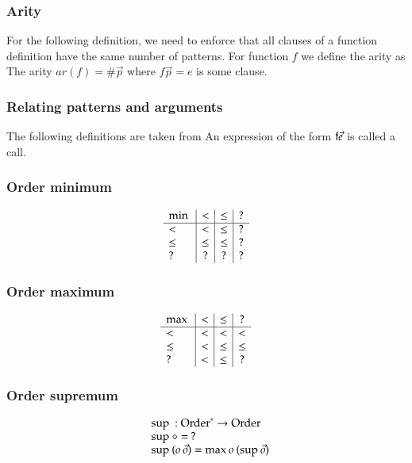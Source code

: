 \subsubsection{Arity}
For the following definition, we need to enforce that all clauses of a function definition have the same number of patterns.
For function $f$ we define the arity as The arity $ar(f) = \# \vec{p} $ where $f \vec{p} = e $ is some clause.   


\subsubsection{Relating patterns and arguments}

The following definitions are taken from \cite{abelAltenkirch:predStRec}
An expression of the form $\mathsf{f} \vec{e}$ is called a call.

\newcommand{\mino}{\mathrm{min}\:}
\newcommand{\maxo}{\mathrm{max}\:}
\newcommand{\supo}{\mathrm{sup}\:}
\newcommand{\info}{\mathrm{inf}\:}

\subsubsection{Order minimum}
\[
\begin{array}{l | c |c | c}
 \mino &  <      &  \leq    & ? \\
\hline
  <    & <       &  \leq    &   ? \\
 \leq  & \leq    &  \leq    &   ?  \\
 ?     & ?       &  ?       &   ?
\end{array}
\]

\subsubsection{Order maximum}
\[
\begin{array}{l | c |c | c}
 \maxo & <      &  \leq    &   ? \\
\hline
  <    & <       & <       &   <    \\
 \leq  & <       & \leq    &   \leq  \\
 ?     & <       & \leq    &   ?
\end{array}
\]

\subsubsection{Order supremum}
\[
\begin{array}[t]{ll}
\multicolumn{2}{l}{\supo : \ves{\order} \ra \order}\\ 
\supo \diamond = \: ? \\
\supo (o \: \vec{o} ) = \maxo o \: (\supo \vec{o}) \\
\end{array}
\]

